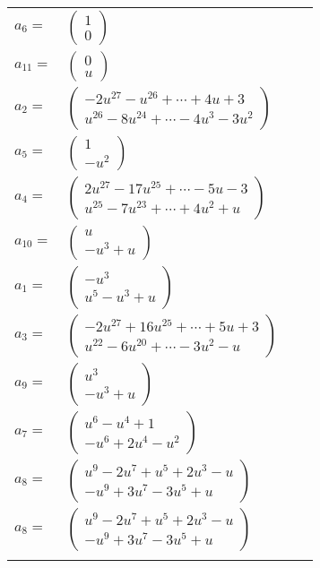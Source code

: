 \documentclass[1p]{elsarticle_modified}
\theoremstyle{definition}
\begin{document}
\begin{tabular}{m{7pt} m{180pt} m{7pt} m{180pt} }
\flushright $a_{6}=$&$\begin{pmatrix}1\\0\end{pmatrix}$ \\
\flushright $a_{11}=$&$\begin{pmatrix}0\\u\end{pmatrix}$ \\
\flushright $a_{2}=$&$\begin{pmatrix}-2 u^{27}- u^{26}+\cdots+4 u+3\\u^{26}-8 u^{24}+\cdots-4 u^3-3 u^2\end{pmatrix}$ \\
\flushright $a_{5}=$&$\begin{pmatrix}1\\- u^2\end{pmatrix}$ \\
\flushright $a_{4}=$&$\begin{pmatrix}2 u^{27}-17 u^{25}+\cdots-5 u-3\\u^{25}-7 u^{23}+\cdots+4 u^2+u\end{pmatrix}$ \\
\flushright $a_{10}=$&$\begin{pmatrix}u\\- u^3+u\end{pmatrix}$ \\
\flushright $a_{1}=$&$\begin{pmatrix}- u^3\\u^5- u^3+u\end{pmatrix}$ \\
\flushright $a_{3}=$&$\begin{pmatrix}-2 u^{27}+16 u^{25}+\cdots+5 u+3\\u^{22}-6 u^{20}+\cdots-3 u^2- u\end{pmatrix}$ \\
\flushright $a_{9}=$&$\begin{pmatrix}u^3\\- u^3+u\end{pmatrix}$ \\
\flushright $a_{7}=$&$\begin{pmatrix}u^6- u^4+1\\- u^6+2 u^4- u^2\end{pmatrix}$ \\
\flushright $a_{8}=$&$\begin{pmatrix}u^9-2 u^7+u^5+2 u^3- u\\- u^9+3 u^7-3 u^5+u\end{pmatrix}$\\ \flushright $a_{8}=$&$\begin{pmatrix}u^9-2 u^7+u^5+2 u^3- u\\- u^9+3 u^7-3 u^5+u\end{pmatrix}$\\&\end{tabular}
\end{document}
